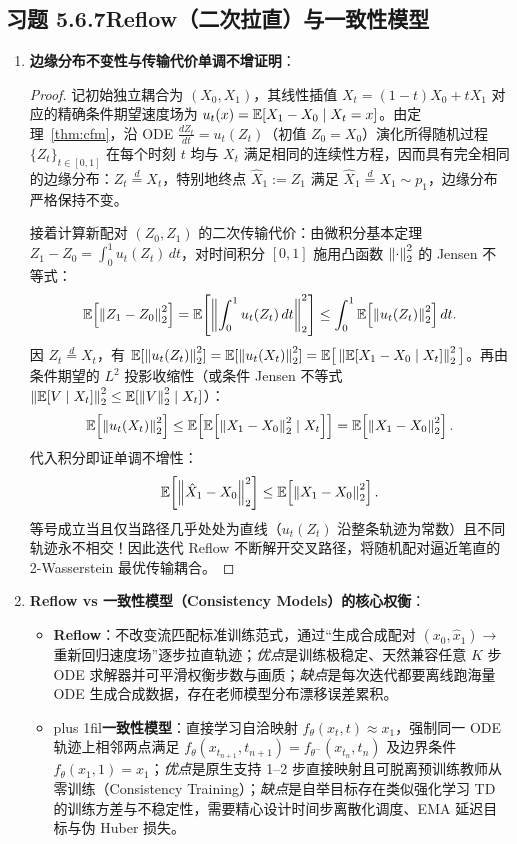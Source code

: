 \subsection*{习题 5.6.7\quad Reflow（二次拉直）与一致性模型}
\begin{enumerate}[label=(\alph*), leftmargin=1.8em]
  \item \textbf{边缘分布不变性与传输代价单调不增证明}：
  \begin{proof}
  记初始独立耦合为 $(X_0, X_1)$，其线性插值 $X_t = (1-t)X_0 + t X_1$ 对应的精确条件期望速度场为 $u_t(x) = \mathbb{E}[X_1 - X_0 \mid X_t = x]$。由定理~\ref{thm:cfm}，沿 ODE $\frac{d Z_t}{dt} = u_t(Z_t)$（初值 $Z_0 = X_0$）演化所得随机过程 $\{Z_t\}_{t\in[0,1]}$ 在每个时刻 $t$ 均与 $X_t$ 满足相同的连续性方程，因而具有完全相同的边缘分布：$Z_t \stackrel{d}{=} X_t$，特别地终点 $\hat{X}_1 := Z_1$ 满足 $\hat{X}_1 \stackrel{d}{=} X_1 \sim p_1$，边缘分布严格保持不变。

  接着计算新配对 $(Z_0, Z_1)$ 的二次传输代价：由微积分基本定理 $Z_1 - Z_0 = \int_0^1 u_t(Z_t)\,dt$，对时间积分 $[0,1]$ 施用凸函数 $\left\|\cdot\right\|_2^2$ 的 Jensen 不等式：
  \[
    \mathbb{E}\!\left[\left\|Z_1 - Z_0\right\|_2^2\right]
    = \mathbb{E}\!\left[\left\|\int_0^1 u_t(Z_t)\,dt\right\|_2^2\right]
    \le \int_0^1 \mathbb{E}\!\left[\left\|u_t(Z_t)\right\|_2^2\right] dt.
  \]
  因 $Z_t \stackrel{d}{=} X_t$，有 $\mathbb{E}[\left\|u_t(Z_t)\right\|_2^2] = \mathbb{E}[\left\|u_t(X_t)\right\|_2^2] = \mathbb{E}\big[\left\|\mathbb{E}[X_1 - X_0 \mid X_t]\right\|_2^2\big]$。再由条件期望的 $L^2$ 投影收缩性（或条件 Jensen 不等式 $\left\|\mathbb{E}[V \mid X_t]\right\|_2^2 \le \mathbb{E}[\left\|V\right\|_2^2 \mid X_t]$）：
  \[
    \mathbb{E}\!\left[\left\|u_t(X_t)\right\|_2^2\right]
    \le \mathbb{E}\!\left[\mathbb{E}\!\left[\left\|X_1 - X_0\right\|_2^2 \mid X_t\right]\right]
    = \mathbb{E}\!\left[\left\|X_1 - X_0\right\|_2^2\right].
  \]
  代入积分即证单调不增性：
  \[
    \mathbb{E}\!\left[\left\|\hat{X}_1 - X_0\right\|_2^2\right] \le \mathbb{E}\!\left[\left\|X_1 - X_0\right\|_2^2\right].
  \]
  等号成立当且仅当路径几乎处处为直线（$u_t(Z_t)$ 沿整条轨迹为常数）且不同轨迹永不相交！因此迭代 Reflow 不断解开交叉路径，将随机配对逼近笔直的 2-Wasserstein 最优传输耦合。
  \end{proof}

  \item \textbf{Reflow vs 一致性模型（Consistency Models）的核心权衡}：
  \begin{itemize}
    \item \textbf{Reflow}：不改变流匹配标准训练范式，通过“生成合成配对 $(x_0, \hat{x}_1) \to$ 重新回归速度场”逐步拉直轨迹；\emph{优点}是训练极稳定、天然兼容任意 $K$ 步 ODE 求解器并可平滑权衡步数与画质；\emph{缺点}是每次迭代都要离线跑海量 ODE 生成合成数据，存在老师模型分布漂移误差累积。
    \item {\rightskip=0pt plus 1fil\relax \textbf{一致性模型}：直接学习自洽映射 $f_\theta(x_t, t) \approx x_1$，强制同一 ODE 轨迹上相邻两点满足 $f_\theta(x_{t_{n+1}}, t_{n+1}) = f_{\theta^-}(x_{t_n}, t_n)$ 及边界条件 $f_\theta(x_1, 1) = x_1$；\emph{优点}是原生支持 1--2 步直接映射且可脱离预训练教师从零训练（Consistency Training）；\emph{缺点}是自举目标存在类似强化学习 TD 的训练方差与不稳定性，需要精心设计时间步离散化调度、EMA 延迟目标与伪 Huber 损失。\par}
  \end{itemize}
\end{enumerate}

